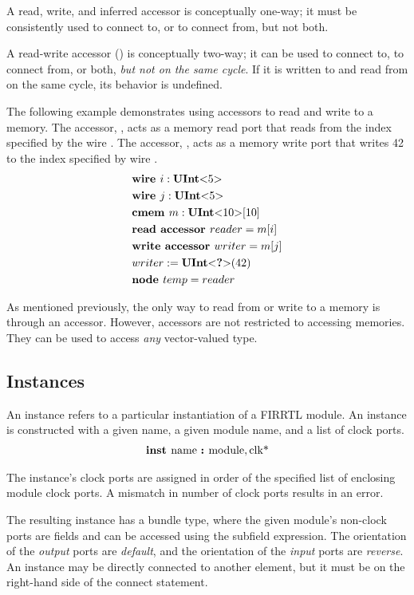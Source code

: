 \documentclass[12pt]{article}
\begin{document}
A read, write, and inferred accessor is conceptually one-way; it must be consistently used to connect to, or to connect from, but not both.

A read-write accessor () is conceptually two-way; it can be used to connect to, to connect from, or both, {\em but not on the same cycle}.
If it is written to and read from on the same cycle, its behavior is undefined.

The following example demonstrates using accessors to read and write to a memory.
The accessor, , acts as a memory read port that reads from the index specified by the wire .
The accessor, , acts as a memory write port that writes 42 to the index specified by wire .
\[
\begin{aligned}
&\text{\bf wire\ } i : \text{\bf UInt}\text{\bf $<$} 5 \text{\bf $>$} \\
&\text{\bf wire\ } j : \text{\bf UInt}\text{\bf $<$} 5 \text{\bf $>$} \\
&\text{\bf cmem\ } m : \text{\bf UInt}\text{\bf $<$} 10 \text{\bf $>$}[10] \\
&\text{\bf read\ } \text{\bf accessor\ } reader = m[i] \\
&\text{\bf write\ } \text{\bf accessor\ } writer = m[j] \\
&writer := \text{\bf UInt}\text{\bf $<$} \text{\bf ?} \text{\bf $>$}(42) \\
&\text{\bf node\ } temp = reader \\
\end{aligned}
\]

As mentioned previously, the only way to read from or write to a memory is through an accessor.
However, accessors are not restricted to accessing memories.
They can be used to access {\em any} vector-valued type. 

\subsection{Instances}
An instance refers to a particular instantiation of a FIRRTL module.
An instance is constructed with a given name, a given module name, and a list of clock ports.
\[
\begin{aligned}
\text{\bf inst\ } \text{name } \text{\bf :\ } \text{module}, \text{clk*}
\end{aligned}
\]

The instance's clock ports are assigned in order of the specified list of enclosing module clock ports.
A mismatch in number of clock ports results in an error.

The resulting instance has a bundle type, where the given module's non-clock ports are fields and can be accessed using the subfield expression.
The orientation of the {\em output} ports are {\em default}, and the orientation of the {\em input} ports are {\em reverse}.
An instance may be directly connected to another element, but it must be on the right-hand side of the connect statement.
\end{document}
